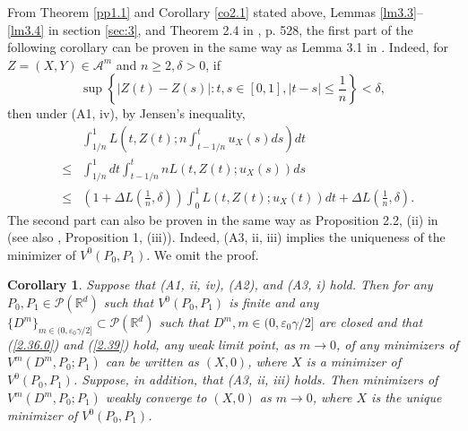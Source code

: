 \documentclass[12pt]{article}
\newtheorem{corollary}{Corollary}[section]
\begin{document}
From Theorem \ref{pp1.1} and Corollary \ref{co2.1} stated above, 
Lemmas  \ref{lm3.3}--\ref{lm3.4} in section \ref{sec:3}, and Theorem 2.4 in \cite{2-JS}, p. 528, 
the first part of the following corollary can be proven in the same way as 
Lemma 3.1 in \cite{MT06}.
Indeed, 
for $Z=(X,Y)\in \mathcal{A}^m$ and $n\ge 2, \delta >0$, if 
$$\sup\left\{|Z(t)-Z(s)|: t,s\in [0,1], |t-s|\le \frac{1}{n}\right\}<\delta,$$
then under (A1, iv), by Jensen's inequality,
\begin{eqnarray}
&&\int_{1/n}^1
L\left(t,Z(t);n\int_{t-1/n}^t u_X(s)ds\right)dt\\
&\le& \int_{1/n}^1dt
\int_{t-1/n}^t nL\left(t,Z(t);u_X(s)\right)ds\nonumber\\
&\le& \left(1+\Delta L\left(\frac{1}{n}, \delta\right)\right)
\int_0^1 L\left(t,Z(t);u_X(t)\right)dt+\Delta L\left(\frac{1}{n}, \delta\right).\nonumber
\end{eqnarray}
The second part can also be  proven in the same way as  Proposition 2.2, (ii) in \cite{MT06}
(see also \cite{M21}, Proposition 1, (iii)).
Indeed, (A3, ii, iii) implies the uniqueness of the minimizer of $V^0(P_0,P_1)$.
We omit the proof.


\begin{corollary}\label {co2.3}
Suppose that (A1, ii, iv), (A2), and (A3, i) hold.
Then for any $P_0,P_1\in \mathcal{P}(\mathbb{R}^d )$ such that $V^0(P_0,P_1)$ is finite
and any $\{D^m\}_{m\in (0, \varepsilon_0\gamma/2]}\subset \mathcal{P}(\mathbb{R}^d)$ such that $D^m, m\in (0, \varepsilon_0\gamma/2]$ are closed and that (\ref{2.36.0}) and (\ref{2.39}) hold,
any weak limit point, as $m\to 0$, of  any minimizers of $V^{m}(D^m
, P_0;P_1)$ can be written as $(X, 0)$, where $X$ is a minimizer of $V^0(P_0,P_1)$.
Suppose, in addition, that (A3, ii, iii) holds. 
Then minimizers of $V^{m}(D^m, P_0;P_1)$ weakly converge to $(X, 0)$ as $m\to 0$,
where $X$ is the unique minimizer of $V^0(P_0,P_1)$.
\end{corollary}
\end{document}
